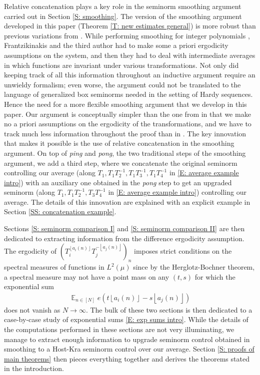\documentclass[11pt]{amsart}
\theoremstyle{definition}
\DeclareMathOperator*{\E}{\mathbb{E}}
\newcommand{\inv}{^{-1}}
\newcommand{\1}{{\mathbf{1}}}
\newcommand{\floor}[1]{{\left \lfloor #1 \right \rfloor}}
\begin{document}
Relative concatenation plays a key role in the seminorm smoothing argument carried out in Section \ref{S: smoothing}. The version of the smoothing argument developed in this paper (Theorem \ref{T: new estimates general}) is more robust than previous variations from \cite{DKKST24, FrKu22b, FrKu22a}. While performing smoothing for integer polynomials \cite{FrKu22b}, Frantzikinakis and the third author had to make some a priori ergodicity assumptions on the system, and then they had to deal with intermediate averages in which functions are invariant under various transformations. Not only did keeping track of all this information throughout an inductive argument require an unwieldy formalism; even worse, the argument could not be translated to the language of generalized box seminorms needed in the setting of Hardy sequences. Hence the need for a more flexible smoothing argument that we develop in this paper. Our argument is conceptually simpler than the one from \cite{FrKu22b} in that we make no a priori assumptions on the ergodicity of the transformations, and we have to track much less information throughout the proof than in \cite{FrKu22b}. The key innovation that makes it possible is the use of relative concatenation in the smoothing argument. On top of \textit{ping} and \textit{pong}, the two traditional steps of the smoothing argument, we add a third step, where we concatenate the original seminorm controlling our average (along $T_1, T_1T_2\inv, T_1T_3\inv, T_1T_4\inv$ in \eqref{E: average example intro}) with an auxiliary one obtained in the \textit{pong} step to get an upgraded seminorm (along $T_1, T_1T_2\inv, T_3T_4\inv$ in \eqref{E: average example intro}) controlling our average. The details of this innovation are explained with an explicit example in Section \ref{SS: concatenation example}.

Sections \ref{S: seminorm comparison I} and \ref{S: seminorm comparison II} are then dedicated to extracting information from the difference ergodicity assumption. The ergodicity of $(T_i^{\floor{a_i(n)}}T_j^{-\floor{a_j(n)}})_n$ imposes strict conditions on the spectral measures of functions in $L^2(\mu)$ since by the Herglotz-Bochner theorem, a spectral measure may not have a point mass on any $(t,s)$ for which the exponential sum
\begin{align}\label{E: exp sums intro}
    \E_{n\in[N]}e(t\floor{a_i(n)}-s\floor{a_j(n)})
\end{align}
does not vanish as $N\to\infty$. The bulk of these two sections is then dedicated to a case-by-case study of exponential sums \eqref{E: exp sums intro}. While the details of the computations performed in these sections are not very illuminating, we manage to extract enough information to upgrade seminorm control obtained in smoothing to a Host-Kra seminorm control over our average. Section \ref{S: proofs of main theorems} then pieces everything together and derives the theorems stated in the introduction.
\end{document}
